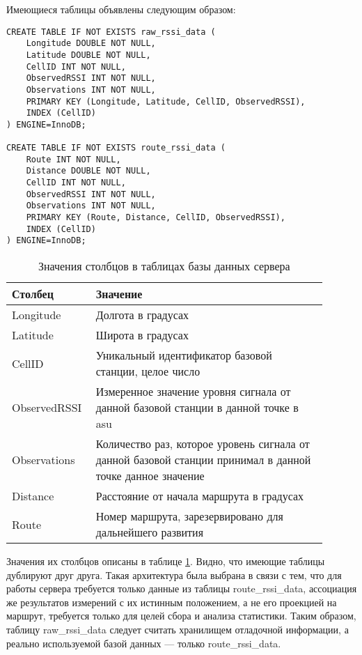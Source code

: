 Имеющиеся таблицы объявлены следующим образом:

\lstset{language=SQL}
\begin{lstlisting}
CREATE TABLE IF NOT EXISTS raw_rssi_data (
	Longitude DOUBLE NOT NULL,
	Latitude DOUBLE NOT NULL,
	CellID INT NOT NULL,
	ObservedRSSI INT NOT NULL,
	Observations INT NOT NULL,
	PRIMARY KEY (Longitude, Latitude, CellID, ObservedRSSI),
	INDEX (CellID)
) ENGINE=InnoDB;

CREATE TABLE IF NOT EXISTS route_rssi_data (
	Route INT NOT NULL,
	Distance DOUBLE NOT NULL,
	CellID INT NOT NULL,
	ObservedRSSI INT NOT NULL,
	Observations INT NOT NULL,
	PRIMARY KEY (Route, Distance, CellID, ObservedRSSI),
	INDEX (CellID)
) ENGINE=InnoDB;
\end{lstlisting}

\begin{table}
	\caption{\label{tab:server-db}Значения столбцов в таблицах базы данных сервера}
	\begin{center}
		\begin{tabular}{|p{0.2\linewidth}|p{0.7\linewidth}|}
			\hline
			Столбец & Значение \\
			\hline
			Longitude & Долгота в градусах \\
			\hline
			Latitude & Широта в градусах \\
			\hline
			CellID & Уникальный идентификатор базовой станции, целое число \\
			\hline
			ObservedRSSI & Измеренное значение уровня сигнала от данной базовой станции в данной точке в asu\\
			\hline
			Observations & Количество раз, которое уровень сигнала от данной базовой станции принимал в данной точке данное значение\\
			\hline
			Distance & Расстояние от начала маршрута в градусах \\
			\hline
			Route & Номер маршрута, зарезервировано для дальнейшего развития \\
			\hline
		\end{tabular}
	\end{center}
\end{table}

Значения их столбцов описаны в таблице \ref{tab:server-db}. Видно, что имеющие таблицы дублируют друг друга. Такая архитектура была выбрана в связи с тем, что для работы сервера требуется только данные из таблицы route\_rssi\_data, ассоциация же результатов измерений с их истинным положением, а не его проекцией на маршрут, требуется только для целей сбора и анализа статистики. Таким образом, таблицу raw\_rssi\_data следует считать хранилищем отладочной информации, а реально используемой базой данных --- только route\_rssi\_data.

